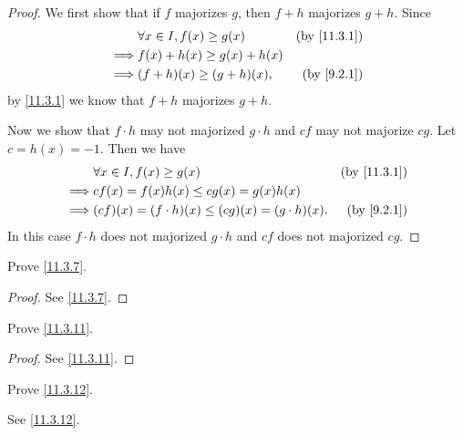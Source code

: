 \begin{proof}
  We first show that if \(f\) majorizes \(g\), then \(f + h\) majorizes \(g + h\).
  Since
  \begin{align*}
             & \forall x \in I, f(x) \geq g(x) & \text{(by \cref{11.3.1})} \\
    \implies & f(x) + h(x) \geq g(x) + h(x)                                \\
    \implies & (f + h)(x) \geq (g + h)(x),     & \text{(by \cref{9.2.1})}
  \end{align*}
  by \cref{11.3.1} we know that \(f + h\) majorizes \(g + h\).

  Now we show that \(f \cdot h\) may not majorized \(g \cdot h\) and \(cf\) may not majorize \(cg\).
  Let \(c = h(x) = -1\).
  Then we have
  \begin{align*}
             & \forall x \in I, f(x) \geq g(x)                         & \text{(by \cref{11.3.1})} \\
    \implies & cf(x) = f(x) h(x) \leq cg(x) = g(x) h(x)                                            \\
    \implies & (cf)(x) = (f \cdot h)(x) \leq (cg)(x) = (g \cdot h)(x). & \text{(by \cref{9.2.1})}
  \end{align*}
  In this case \(f \cdot h\) does not majorized \(g \cdot h\) and \(cf\) does not majorized \(cg\).
\end{proof}

\begin{exercise}\label{ex 11.3.3}
  Prove \cref{11.3.7}.
\end{exercise}

\begin{proof}
  See \cref{11.3.7}.
\end{proof}

\begin{exercise}\label{ex 11.3.4}
  Prove \cref{11.3.11}.
\end{exercise}

\begin{proof}
  See \cref{11.3.11}.
\end{proof}

\begin{exercise}\label{ex 11.3.5}
  Prove \cref{11.3.12}.
\end{exercise}

\begin{proposition}
  See \cref{11.3.12}.
\end{proposition}